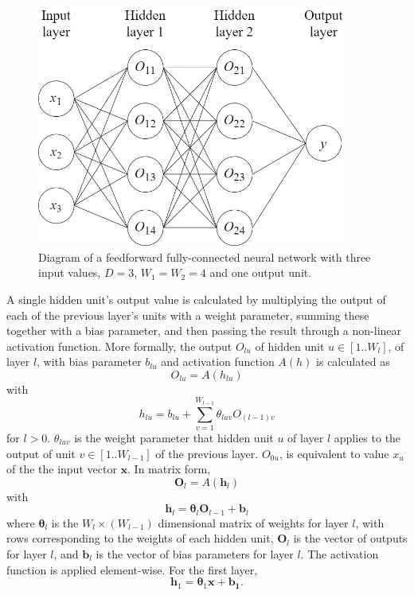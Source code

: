 \documentclass[12pt]{article}
\begin{document}
\begin{figure}[h]
\centering
\includegraphics[width=4in]{images/feedforward_nn.png}
\caption{Diagram of a feedforward fully-connected neural network with three input values, $D=3$, $W_1=W_2=4$ and one output unit.}
\end{figure}

A single hidden unit's output value is calculated by multiplying the output of each of the previous layer's units with a weight parameter, summing these together with a bias parameter, and then passing the result through a non-linear activation function. More formally, the output $O_{lu}$ of hidden unit $u\in[1..W_l]$, of layer $l$, with bias parameter $b_{lu}$ and activation function $A(h)$ is calculated as
\begin{equation}
O_{lu}=A(h_{lu})
\end{equation}
with
\begin{equation}
h_{lu}=b_{lu}+\sum_{v=1}^{W_{l-1}}\theta_{luv}O_{(l-1)v}
\end{equation}
for $l > 0$. $\theta_{luv}$ is the weight parameter that hidden unit $u$ of layer $l$ applies to the output of unit $v\in[1..W_{l-1}]$ of the previous layer. $O_{0u}$, is equivalent to value $x_u$ of the the input vector $\bm{x}$. In matrix form,
\begin{equation}
\bm{O}_l=A(\bm{h}_l)
\end{equation}
with
\begin{equation}
\bm{h}_l=\boldsymbol\theta_l\bm{O}_{l-1}+\bm{b}_l
\end{equation}
where $\boldsymbol\theta_l$ is the $W_l \times \left(W_{l-1}\right)$ dimensional matrix of weights for layer $l$, with rows corresponding to the weights of each hidden unit, $\bm{O}_l$ is the vector of outputs for layer $l$, and $\bm{b}_l$ is the vector of bias parameters for layer $l$. The activation function is applied element-wise. For the first layer,
\begin{equation}
\bm{h}_1=\boldsymbol\theta_1\bm{x}+\bm{b_1}.
\end{equation}
\end{document}
